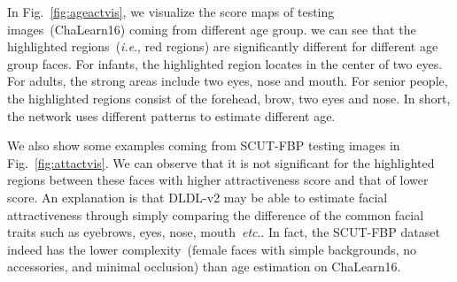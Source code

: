 \documentclass[5p,times,twocolumn]{elsarticle}
\makeatletter
\DeclareRobustCommand\onedot{\@onedot}
\def\@onedot{.}
\def\ie{\emph{i.e}\onedot}
\def\etc{\emph{etc}\onedot}
\makeatother
\begin{document}
In Fig.~\ref{fig:ageactvis}, we visualize the score maps of testing images~(ChaLearn16) coming from different age group. we can see that the highlighted regions~(\ie, red regions) are significantly different for different age group faces. For infants, the highlighted region locates in the center of two eyes. For adults, the strong areas include two eyes, nose and mouth. For senior people, the highlighted regions consist of the forehead, brow, two eyes and nose. In short, the network uses different patterns to estimate different age. 

We also show some examples coming from SCUT-FBP testing images in Fig.~\ref{fig:attactvis}. We can observe that it is not significant for the highlighted regions between these faces with higher attractiveness score and that of lower score. An explanation is that DLDL-v2 may be able to estimate facial attractiveness through simply comparing the difference of the common facial traits such as eyebrows, eyes, nose, mouth~\etc. In fact, the SCUT-FBP dataset indeed has the lower complexity~(female faces with simple backgrounds, no  accessories, and minimal occlusion) than age estimation on ChaLearn16.
\end{document}

